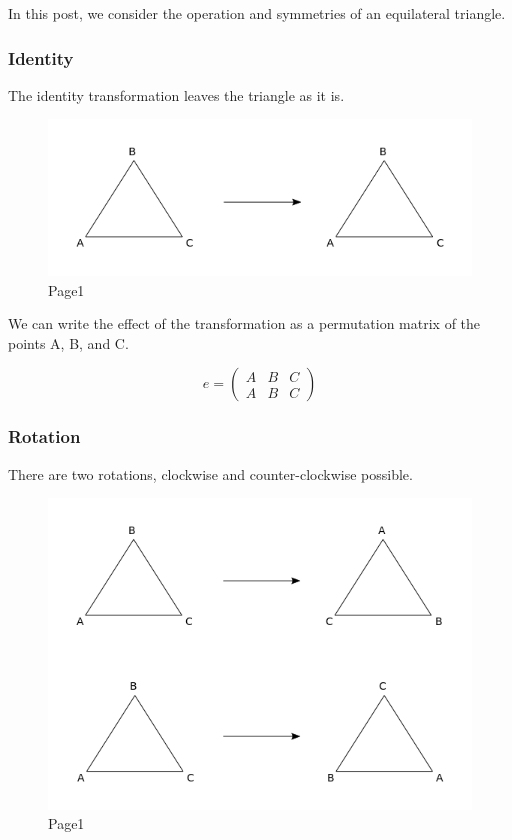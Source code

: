 
In this post, we consider the operation and symmetries of an equilateral
triangle.

\subsubsection{Identity}\label{identity}

The identity transformation leaves the triangle as it is.

\begin{figure}
\centering
\includegraphics[scale=0.7]{images/groups_02_1.png}
\caption{Page1}
\end{figure}

We can write the effect of the transformation as a permutation matrix of
the points A, B, and C.

\[
e=\begin{pmatrix}
A & B & C\\
A & B & C\end{pmatrix}
\]

\subsubsection{Rotation}\label{rotation}

There are two rotations, clockwise and counter-clockwise possible.

\begin{figure}
\centering
\includegraphics[scale=0.7]{images/groups_02_2.png}
\caption{Page1}
\end{figure}

